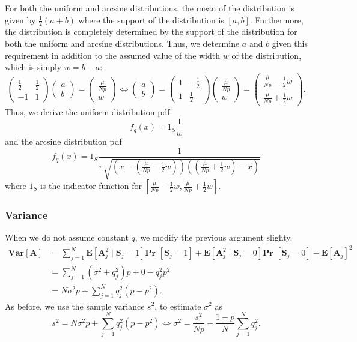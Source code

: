 \documentclass{article}
\def\Pr{\textbf{Pr }}
\def\Var{\textbf{Var}}
\def\E{\textbf{E}}
\newcommand{\rv}[1] {
\text{$\bm{#1}$}
}
\begin{document}
For both the uniform and arcsine distributions, the mean of the distribution is given by $\frac12 (a+b)$ where the support of the distribution is $[a,b]$. Furthermore, the distribution is completely determined by the support of the distribution for both the uniform and arcsine distributions. Thus, we determine $a$ and $b$ given this requirement in addition to the assumed value of the width $w$ of the distribution, which is simply $w = b - a$:
\[
  \begin{pmatrix}\frac12&\frac12\\-1&1\end{pmatrix} \begin{pmatrix}a\\b\end{pmatrix} = \begin{pmatrix}\frac{\overline{\mu}}{Np}\\w\end{pmatrix} \iff \begin{pmatrix}a\\b\end{pmatrix} = \begin{pmatrix}1&-\frac12\\1&\frac12\end{pmatrix} \begin{pmatrix}\frac{\overline{\mu}}{Np}\\w\end{pmatrix} = \begin{pmatrix}\frac{\overline{\mu}}{Np}-\frac12 w\\ \frac{\overline{\mu}}{Np}+\frac12 w\end{pmatrix}.
\]
Thus, we derive the uniform distribution pdf
\[
  f_q(x) = 1_{S} \frac1{w}
\]
and the arcsine distribution pdf
\[
  f_q(x) = 1_{S} \frac1{\pi\sqrt{(x-(\frac{\overline{\mu}}{Np}-\frac12 w))((\frac{\overline{\mu}}{Np}+\frac12 w)-x)}}
\]
where $1_S$ is the indicator function for $\left[\frac{\overline{\mu}}{Np}-\frac12 w,\frac{\overline{\mu}}{Np}+\frac12 w\right]$.

\subsubsection{Variance}
When we do not assume constant $q$, we modify the previous argument slighty.
\begin{align*}
  \Var[\rv{A}] &= \sum_{j=1}^N \E[\rv{A}_j^2\mid \rv{S}_j = 1]\Pr[\rv{S}_j = 1] + \E[\rv{A}_j^2\mid \rv{S}_j = 0]\Pr[\rv{S}_j = 0] - \E[\rv{A}_j]^2 \\
  &= \sum_{j=1}^N (\sigma^2 + q_j^2)p + 0 - q_j^2p^2 \\
  &= N\sigma^2p + \sum_{j=1}^N q_j^2(p - p^2).
\end{align*}
As before, we use the sample variance $s^2$, to estimate $\sigma^2$ as
\[
  s^2 = N\sigma^2p + \sum_{j=1}^N q_j^2(p - p^2) \iff \sigma^2 = \frac{s^2}{Np} - \frac{1-p}{N}\sum_{j=1}^N q_j^2.
\]
\end{document}
